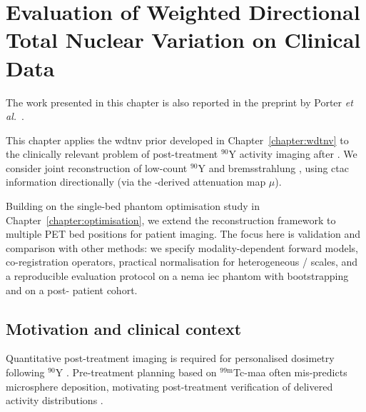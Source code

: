 \chapter{Evaluation of Weighted Directional Total Nuclear Variation on Clinical Data}
\label{chapter:paper}

The work presented in this chapter is also reported in the preprint by Porter \textit{et al.}\ \cite{porterWeightedDirectionalTotal2026}.

This chapter applies the \acrfull{wdtnv} prior developed in Chapter~\ref{chapter:wdtnv} to the clinically relevant problem of post-treatment $^{90}$Y activity imaging after . We consider joint reconstruction of low-count $^{90}$Y  and bremsstrahlung , using \acrfull{ctac} information directionally (via the -derived attenuation map $\mu$).

Building on the single-bed phantom optimisation study in Chapter~\ref{chapter:optimisation}, we extend the reconstruction framework to multiple PET bed positions for patient imaging. The focus here is validation and comparison with other methods: we specify modality-dependent forward models, co-registration operators, practical normalisation for heterogeneous / scales, and a reproducible evaluation protocol on a \acrfull{nema} \acrfull{iec} phantom with  bootstrapping and on a post- patient cohort.

\section{Motivation and clinical context}
\label{sec:90y_motivation}

Quantitative post-treatment imaging is required for personalised dosimetry following $^{90}$Y  \cite{levillainInternationalRecommendationsPersonalised2021}. Pre-treatment planning based on $^{99\mathrm{m}}$Tc-\gls{maa} often mis-predicts microsphere deposition, motivating post-treatment verification of delivered activity distributions \cite{hasteCorrelationTechnetium99mMacroaggregated2017}.

